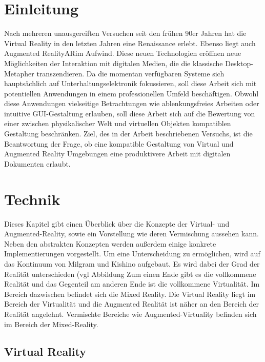\documentclass[12pt,a4paper,bibliography=totocnumbered,listof=totocnumbered]{scrartcl}
\begin{document}
\section{Einleitung}
Nach mehreren unausgereiften Versuchen seit den frühen 90er Jahren hat die Virtual Reality in den letzten Jahren eine Renaissance erlebt. Ebenso liegt auch Augmented Reality\ac{AR}im Aufwind. Diese neuen Technologien eröffnen neue Möglichkeiten der Interaktion mit digitalen Medien, die die klassische Desktop-Metapher transzendieren. Da die momentan verfügbaren Systeme sich hauptsächlich auf Unterhaltungselektronik fokussieren, soll diese Arbeit sich mit potentiellen Anwendungen in einem professionellen Umfeld beschäftigen. Obwohl diese Anwendungen vielseitige Betrachtungen wie ablenkungsfreies Arbeiten oder intuitive GUI-Gestaltung erlauben, soll diese Arbeit sich auf die Bewertung von einer zwischen physikalischer Welt und virtuellen Objekten kompatiblen Gestaltung beschränken. Ziel, des in der Arbeit beschriebenen Versuchs, ist die Beantwortung der Frage, ob eine kompatible Gestaltung von Virtual und Augmented Reality Umgebungen eine produktivere Arbeit mit digitalen Dokumenten erlaubt.
\section{Technik}
Dieses Kapitel gibt einen Überblick über die Konzepte der Virtual- und Augmented-Reality, sowie ein Vorstellung wie deren Vermischung aussehen kann. Neben den abstrakten Konzepten werden außerdem einige konkrete Implementierungen vorgestellt. Um eine Unterscheidung zu ermöglichen, wird auf das Kontinuum von Milgram und Kishino aufgebaut. Es wird dabei der Grad der Realität unterschieden (vgl Abbildung %
Zum einen Ende gibt es die vollkommene Realität und das Gegenteil am anderen Ende ist die vollkommene Virtualität. Im Bereich dazwischen befindet sich die Mixed Reality. Die Virtual Reality liegt im Bereich der Virtualität und die Augmented Realität ist näher an den Bereich der Realität angelehnt. Vermischte Bereiche wie Augmented-Virtuality befinden sich im Bereich der Mixed-Reality.
\subsection{Virtual Reality}
\end{document}
